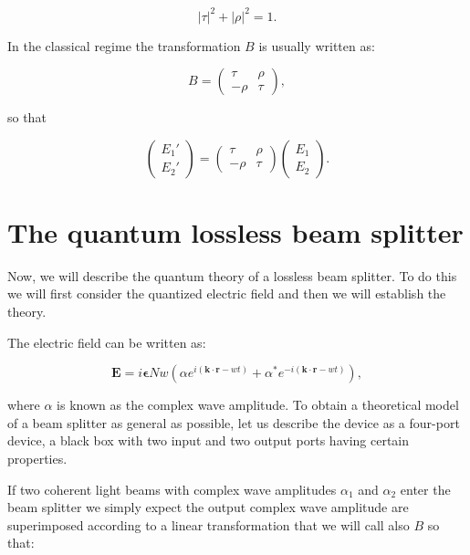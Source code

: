 \documentclass{book}
\begin{document}
\begin{equation}
|\tau|^{2}+|\rho|^{2}=1.
\end{equation}
 
 In the classical regime the transformation $B$ is usually written as:
 
 \begin{equation}
 B=\begin{pmatrix} \tau & \rho \\ -\rho & \tau \end{pmatrix},
 \end{equation}


so that

\begin{equation}
\begin{pmatrix} E_{1}' \\ E_{2}' \end{pmatrix}=\begin{pmatrix} \tau & \rho \\ -\rho & \tau \end{pmatrix} \begin{pmatrix} E_{1} \\ E_{2} \end{pmatrix}.
\end{equation}




\section{The quantum lossless beam splitter}

Now, we will describe the quantum theory of a lossless beam splitter. To do this we will first consider the quantized electric field and then we will establish the theory. 


The  electric field can be written as:

\begin{equation}
\mathbf{E}=i \mathbf{\epsilon}N w \left( \alpha e^{i (\mathbf{k \cdot r}-w t)}+\alpha^{*} e^{-i (\mathbf{k \cdot r}-w t)} \right),
\end{equation}

where $\alpha$ is known as the complex wave amplitude. To obtain a theoretical model of a beam splitter as general as possible, let us describe the device as a four-port device, a black box with two input and two output ports having certain properties.

If two coherent light beams with complex wave amplitudes $\alpha_{1}$ and $\alpha_{2}$ enter the beam splitter we simply expect the output complex wave amplitude  are superimposed according to a linear transformation that we will call also $B$ so that:
\end{document}
